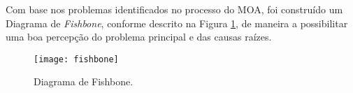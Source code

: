 Com base nos problemas identificados no processo do MOA, foi construído um Diagrama de \emph{Fishbone}, conforme descrito na Figura \ref{fig:fishbone}, de maneira a possibilitar uma boa percepção do problema principal e das causas raízes.
\begin{landscape}
	\vspace*{\fill}
	\begin{figure}[H]
		\centering
		\texttt{[image: fishbone]}
		\caption[Diagrama de Fishbone]{Diagrama de Fishbone.}
		\label{fig:fishbone}
	\end{figure}
	\vspace*{\fill}
\end{landscape}